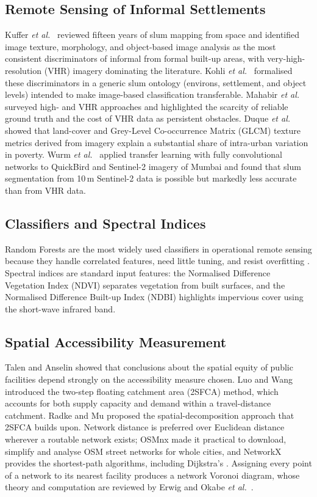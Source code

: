 \documentclass[conference]{IEEEtran}
\newcommand{\m}{\,m}
\begin{document}
\subsection{Remote Sensing of Informal Settlements}
Kuffer \textit{et al.}\ \cite{kuffer2016} reviewed fifteen years of slum mapping from space and identified image texture, morphology, and object-based image analysis as the most consistent discriminators of informal from formal built-up areas, with very-high-resolution (VHR) imagery dominating the literature. Kohli \textit{et al.}\ \cite{kohli2012} formalised these discriminators in a generic slum ontology (environs, settlement, and object levels) intended to make image-based classification transferable. Mahabir \textit{et al.}\ \cite{mahabir2018} surveyed high- and VHR approaches and highlighted the scarcity of reliable ground truth and the cost of VHR data as persistent obstacles. Duque \textit{et al.}\ \cite{duque2015} showed that land-cover and Grey-Level Co-occurrence Matrix (GLCM) texture metrics \cite{haralick1973} derived from imagery explain a substantial share of intra-urban variation in poverty. Wurm \textit{et al.}\ \cite{wurm2019} applied transfer learning with fully convolutional networks to QuickBird and Sentinel-2 imagery of Mumbai and found that slum segmentation from 10\m{} Sentinel-2 data is possible but markedly less accurate than from VHR data.

\subsection{Classifiers and Spectral Indices}
Random Forests \cite{breiman2001} are the most widely used classifiers in operational remote sensing because they handle correlated features, need little tuning, and resist overfitting \cite{belgiu2016}. Spectral indices are standard input features: the Normalised Difference Vegetation Index (NDVI) \cite{tucker1979} separates vegetation from built surfaces, and the Normalised Difference Built-up Index (NDBI) \cite{zha2003} highlights impervious cover using the short-wave infrared band.

\subsection{Spatial Accessibility Measurement}
Talen and Anselin \cite{talen1998} showed that conclusions about the spatial equity of public facilities depend strongly on the accessibility measure chosen. Luo and Wang \cite{luo2003} introduced the two-step floating catchment area (2SFCA) method, which accounts for both supply capacity and demand within a travel-distance catchment. Radke and Mu \cite{radke2000} proposed the spatial-decomposition approach that 2SFCA builds upon. Network distance is preferred over Euclidean distance wherever a routable network exists; OSMnx \cite{boeing2017} made it practical to download, simplify and analyse OSM street networks for whole cities, and NetworkX \cite{hagberg2008} provides the shortest-path algorithms, including Dijkstra's \cite{dijkstra1959}. Assigning every point of a network to its nearest facility produces a network Voronoi diagram, whose theory and computation are reviewed by Erwig \cite{erwig2000} and Okabe \textit{et al.}\ \cite{okabe2008}.
\end{document}
